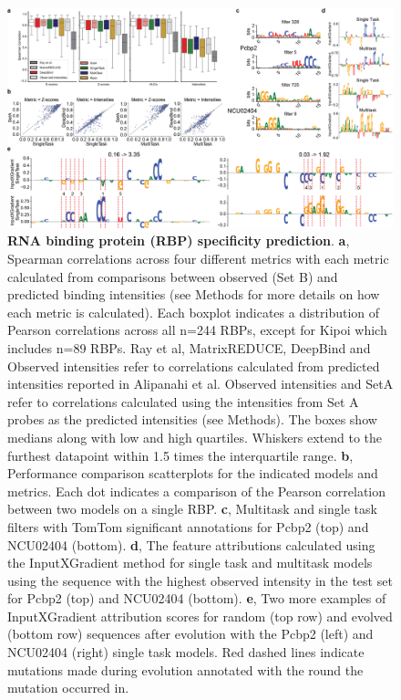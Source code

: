\begin{figure}[p]
    \centering
    \includegraphics[width=\textwidth]{1_figures-and-files/suppfigure2.png}
    \caption[RBP specificity prediction]{\textbf{RNA binding protein (RBP) specificity prediction}. \textbf{a}, Spearman correlations across four different metrics with each metric calculated from comparisons between observed (Set B) and predicted binding intensities (see Methods for more details on how each metric is calculated). Each boxplot indicates a distribution of Pearson correlations across all n=244 RBPs, except for Kipoi which includes n=89 RBPs. Ray et al, MatrixREDUCE, DeepBind and Observed intensities refer to correlations calculated from predicted intensities reported in Alipanahi et al. Observed intensities and SetA refer to correlations calculated using the intensities from Set A probes as the predicted intensities (see Methods). The boxes show medians along with low and high quartiles. Whiskers extend to the furthest datapoint within 1.5 times the interquartile range. \textbf{b}, Performance comparison scatterplots for the indicated models and metrics. Each dot indicates a comparison of the Pearson correlation between two models on a single RBP. \textbf{c}, Multitask and single task filters with TomTom significant annotations for Pcbp2 (top) and NCU02404 (bottom). \textbf{d}, The feature attributions calculated using the InputXGradient method for single task and multitask models using the sequence with the highest observed intensity in the test set for Pcbp2 (top) and NCU02404 (bottom). \textbf{e}, Two more examples of InputXGradient attribution scores for random (top row) and evolved (bottom row) sequences after evolution with the Pcbp2 (left) and NCU02404 (right) single task models. Red dashed lines indicate mutations made during evolution annotated with the round the mutation occurred in.}
    \label{fig:supplementary_2}
\end{figure}

